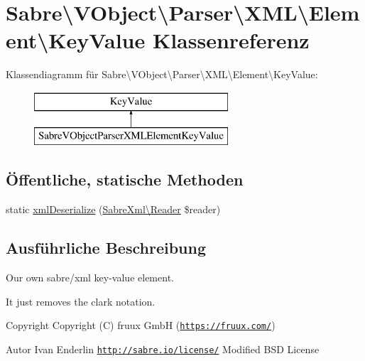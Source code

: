 \hypertarget{class_sabre_1_1_v_object_1_1_parser_1_1_x_m_l_1_1_element_1_1_key_value}{}\section{Sabre\textbackslash{}V\+Object\textbackslash{}Parser\textbackslash{}X\+ML\textbackslash{}Element\textbackslash{}Key\+Value Klassenreferenz}
\label{class_sabre_1_1_v_object_1_1_parser_1_1_x_m_l_1_1_element_1_1_key_value}
Klassendiagramm für Sabre\textbackslash{}V\+Object\textbackslash{}Parser\textbackslash{}X\+ML\textbackslash{}Element\textbackslash{}Key\+Value\+:\begin{figure}[H]
\begin{center}
\leavevmode
\includegraphics[height=2.000000cm]{class_sabre_1_1_v_object_1_1_parser_1_1_x_m_l_1_1_element_1_1_key_value}
\end{center}
\end{figure}
\subsection*{Öffentliche, statische Methoden}
\begin{DoxyCompactItemize}
\item 
static \mbox{\hyperlink{class_sabre_1_1_v_object_1_1_parser_1_1_x_m_l_1_1_element_1_1_key_value_a62f4883ab08626374f264db50172dba1}{xml\+Deserialize}} (\mbox{\hyperlink{class_sabre_1_1_xml_1_1_reader}{Sabre\+Xml\textbackslash{}\+Reader}} \$reader)
\end{DoxyCompactItemize}


\subsection{Ausführliche Beschreibung}
Our own sabre/xml key-\/value element.

It just removes the clark notation.

\begin{DoxyCopyright}{Copyright}
Copyright (C) fruux GmbH (\href{https://fruux.com/}{\tt https\+://fruux.\+com/}) 
\end{DoxyCopyright}
\begin{DoxyAuthor}{Autor}
Ivan Enderlin  \href{http://sabre.io/license/}{\tt http\+://sabre.\+io/license/} Modified B\+SD License 
\end{DoxyAuthor}


